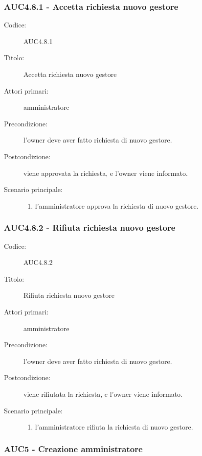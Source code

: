 \documentclass[casi-duso]{subfiles}
\begin{document}
\subsubsection{AUC4.8.1 - Accetta richiesta nuovo gestore}%
\label{subsub:AUC4.8.1}
\begin{description}
  \item[Codice:] AUC4.8.1
  \item[Titolo:] Accetta richiesta nuovo gestore
  \item[Attori primari:] amministratore
  \item[Precondizione:] l'owner deve aver fatto richiesta di nuovo gestore.
  \item[Postcondizione:] viene approvata la richiesta, e l'owner viene informato.
  \item[Scenario principale:]
  \begin{enumerate}
    \item l'amministratore approva la richiesta di nuovo gestore.
  \end{enumerate}
\end{description}  

\subsubsection{AUC4.8.2 - Rifiuta richiesta nuovo gestore}%
\label{subsub:AUC4.8.2}
\begin{description}
  \item[Codice:] AUC4.8.2
  \item[Titolo:] Rifiuta richiesta nuovo gestore
  \item[Attori primari:] amministratore
  \item[Precondizione:] l'owner deve aver fatto richiesta di nuovo gestore.
  \item[Postcondizione:] viene rifiutata la richiesta, e l'owner viene informato.
  \item[Scenario principale:]
  \begin{enumerate}
    \item l'amministratore rifiuta la richiesta di nuovo gestore.
  \end{enumerate}
\end{description}  

\subsubsection{AUC5 - Creazione amministratore}%
\label{subsub:AUC5}
\end{document}
